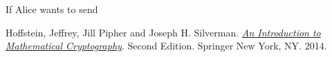 \documentclass[12pt]{article}
\theoremstyle{plain}
\theoremstyle{definition}
\theoremstyle{remark}
\begin{document}
If Alice wants to send 


\begin{thebibliography}{13}

 Hoffstein, Jeffrey, Jill Pipher and Joseph H. Silverman. \href{https://link.springer.com/book/10.1007/978-1-4939-1711-2}{\textit{An Introduction to Mathematical Cryptography}}. Second Edition. Springer New York, NY. 2014.



 
\end{thebibliography}
\end{document}
